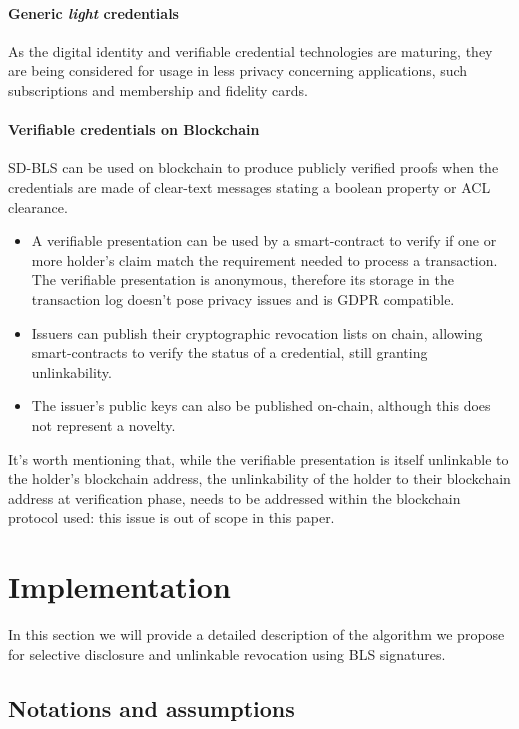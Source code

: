 \paragraph{Generic \textit{light} credentials}
As the digital identity and verifiable credential technologies are maturing, they are being considered for usage in less privacy concerning applications, such subscriptions and membership and fidelity cards.

\paragraph{Verifiable credentials on Blockchain}
SD-BLS can be used on blockchain to produce publicly verified proofs when the credentials are made of clear-text messages stating a boolean property or ACL clearance.
\begin{itemize}
    \item A verifiable presentation can be used by a smart-contract to verify if one or more holder's claim match the requirement needed to process a transaction. The verifiable presentation is anonymous, therefore its storage in the transaction log doesn't pose privacy issues and is GDPR compatible.
    \item Issuers can publish their cryptographic revocation lists on chain, allowing smart-contracts to verify the status of a credential, still granting unlinkability.
    \item The issuer's public keys can also be published on-chain, although this does not represent a novelty.
\end{itemize}

It's worth mentioning that, while the verifiable presentation is itself unlinkable to the holder's blockchain address, the unlinkability of the holder to their blockchain address at verification phase, needs to be addressed within the blockchain protocol used: this issue is out of scope in this paper.

\section{Implementation}

In this section we will provide a detailed description of the algorithm we propose for selective disclosure and unlinkable revocation using BLS signatures.

\subsection{Notations and assumptions}

